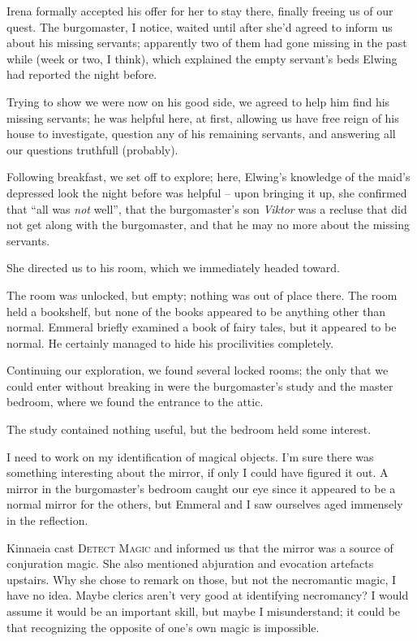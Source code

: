 Irena formally accepted his offer for her to stay there, finally freeing us of our quest. The burgomaster, I notice, waited until after she'd agreed to inform us about his missing servants; apparently two of them had gone missing in the past while (week or two, I think), which explained the empty servant's beds Elwing had reported the night before.

Trying to show we were now on his good side, we agreed to help him find his missing servants; he was helpful here, at first, allowing us have free reign of his house to investigate, question any of his remaining servants, and answering all our questions truthfull (probably).

Following breakfast, we set off to explore; here, Elwing's knowledge of the maid's depressed look the night before was helpful -- upon bringing it up, she confirmed that ``all was \emph{not} well'', that the burgomaster's son \emph{Viktor} was a recluse that did not get along with the burgomaster, and that he may no more about the missing servants.

She directed us to his room, which we immediately headed toward.

The room was unlocked, but empty; nothing was out of place there. The room held a bookshelf, but none of the books appeared to be anything other than normal. Emmeral briefly examined a book of fairy tales, but it appeared to be normal. He certainly managed to hide his procilivities completely.

Continuing our exploration, we found several locked rooms; the only that we could enter without breaking in were the burgomaster's study and the master bedroom, where we found the entrance to the attic.

The study contained nothing useful, but the bedroom held some interest.

I need to work on my identification of magical objects. I'm sure there was something interesting about the mirror, if only I could have figured it out. A mirror in the burgomaster's bedroom caught our eye since it appeared to be a normal mirror for the others, but Emmeral and I saw ourselves aged immensely in the reflection.

Kinnaeia cast \textsc{Detect Magic} and informed us that the mirror was a source of conjuration magic. She also mentioned abjuration and evocation artefacts upstairs. Why she chose to remark on those, but not the necromantic magic, I have no idea. Maybe clerics aren't very good at identifying necromancy? I would assume it would be an important skill, but maybe I misunderstand; it could be that recognizing the opposite of one's own magic is impossible.

